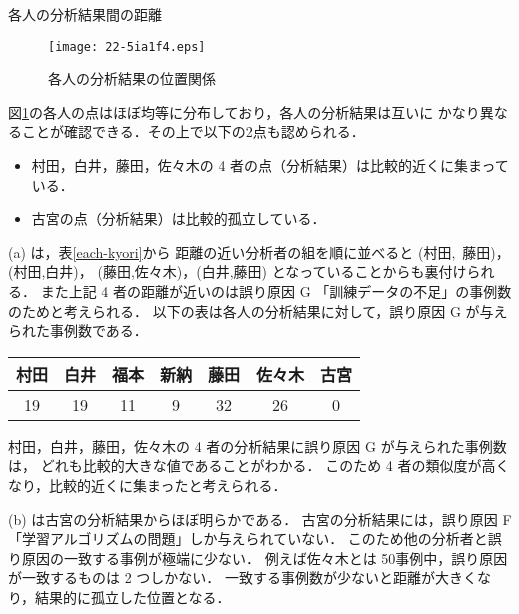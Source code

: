 \documentclass[japanese]{jnlp_1.4}
\begin{document}
\begin{table}[b]
\caption{各人の分析結果間の距離}
\label{each-kyori}

\end{table}
\begin{figure}[b]
\begin{center}
\texttt{[image: 22-5ia1f4.eps]}
\end{center}
\caption{各人の分析結果の位置関係}\label{tajigen-syakudo}
\end{figure} 

\mbox{図\ref{tajigen-syakudo}}の各人の点はほぼ均等に分布しており，各人の分析結果は互いに
かなり異なることが確認できる．その上で以下の2点も認められる．

\begin{itemize}
        \item[(a)] 村田，白井，藤田，佐々木の 4 者の点（分析結果）は比較的近くに集まっている．
        \item[(b)] 古宮の点（分析結果）は比較的孤立している．
\end{itemize}

(a) は，\mbox{表\ref{each-kyori}}から
距離の近い分析者の組を順に並べると
\mbox{(村田, 藤田)}，\mbox{(村田,白井)}，\linebreak
\mbox{(藤田,佐々木)}，\mbox{(白井,藤田)}
となっていることからも裏付けられる．
また上記 4 者の距離が近いのは誤り原因 G 「訓練データの不足」の事例数のためと考えられる．
以下の表は各人の分析結果に対して，誤り原因 G が与えられた事例数である．

\vspace{0.5\Cvs}
\begin{center}
\small
\begin{tabular}{c|c|c|c|c|c|c}
\hline
村田  & 白井 & 福本 & 新納 & 藤田 & 佐々木 & 古宮  \\
\hline
 19   &  19  &  11  &   9  &  32  &   26   &   0   \\
\hline 
\end{tabular}
\end{center}
\vspace{0.5\Cvs}

村田，白井，藤田，佐々木の 4 者の分析結果に誤り原因 G が与えられた事例数は，
どれも比較的大きな値であることがわかる．
このため 4 者の類似度が高くなり，比較的近くに集まったと考えられる．

(b) は古宮の分析結果からほぼ明らかである．
古宮の分析結果には，誤り原因 F 「学習アルゴリズムの問題」しか与えられていない．
このため他の分析者と誤り原因の一致する事例が極端に少ない．
例えば佐々木とは 50事例中，誤り原因が一致するものは 2 つしかない．
一致する事例数が少ないと距離が大きくなり，結果的に孤立した位置となる．
\end{document}
